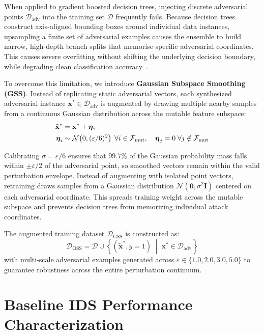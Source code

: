 \documentclass[iicol,pdflatex,sn-mathphys-num]{sn-jnl}
\begin{document}
When applied to gradient boosted decision trees, injecting discrete adversarial points $\mathcal{D}_{\text{adv}}$ into the training set $\mathcal{D}$ frequently fails. Because decision trees construct axis-aligned bounding boxes around individual data instances, upsampling a finite set of adversarial examples causes the ensemble to build narrow, high-depth branch splits that memorise specific adversarial coordinates. This causes severe overfitting without shifting the underlying decision boundary, while degrading clean classification accuracy~\cite{tramer2020adaptive}.

To overcome this limitation, we introduce \textbf{Gaussian Subspace Smoothing (GSS)}. Instead of replicating static adversarial vectors, each synthesized adversarial instance $\mathbf{x}^* \in \mathcal{D}_{\text{adv}}$ is augmented by drawing multiple nearby samples from a continuous Gaussian distribution across the mutable feature subspace:
\begin{align}
    \tilde{\mathbf{x}}^* &= \mathbf{x}^* + \boldsymbol{\eta}, \notag \\
    \boldsymbol{\eta}_i &\sim \mathcal{N}\!\left(0, (\varepsilon/6)^2\right) \;\forall i \in \mathcal{F}_{\text{mut}}, \quad
    \boldsymbol{\eta}_j = 0 \;\forall j \notin \mathcal{F}_{\text{mut}}
\end{align}

Calibrating $\sigma = \varepsilon/6$ ensures that $99.7\%$ of the Gaussian probability mass falls within $\pm \varepsilon/2$ of the adversarial point, so smoothed vectors remain within the valid perturbation envelope. Instead of augmenting with isolated point vectors, retraining draws samples from a Gaussian distribution $\mathcal{N}(\mathbf{0}, \sigma^2 \mathbf{I})$ centered on each adversarial coordinate. This spreads training weight across the mutable subspace and prevents decision trees from memorizing individual attack coordinates.

The augmented training dataset $\mathcal{D}_{\text{GSS}}$ is constructed as:
\begin{equation}
    \mathcal{D}_{\text{GSS}} = \mathcal{D} \cup \left\{ (\tilde{\mathbf{x}}^*, y=1) \;\middle|\; \mathbf{x}^* \in \mathcal{D}_{\text{adv}} \right\}
\end{equation}
with multi-scale adversarial examples generated across $\varepsilon \in \{1.0, 2.0, 3.0, 5.0\}$ to guarantee robustness across the entire perturbation continuum.

\section{Baseline IDS Performance Characterization}
\label{sec:phase1}
\end{document}
